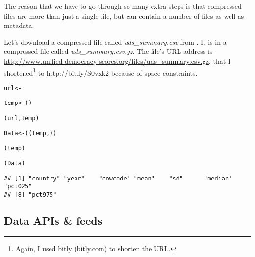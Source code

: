 \noindent The reason that we have to go through so many extra steps is that compressed files are more than just a single file, but can contain a number of files as well as metadata.

Let's download a compressed file called {\emph{uds\_summary.csv}} from \cite{Pemstein2010}. It is in a compressed file called {\emph{uds\_summary.csv.gz}}. The file's URL address is {\url{http://www.unified-democracy-scores.org/files/uds_summary.csv.gz}}, that I shortened\footnote{Again, I used bitly (\url{bitly.com}) to shorten the URL.} to \url{http://bit.ly/S0vxk2} because of space constraints.

{\scriptsize
\begin{knitrout}
\color{fgcolor}\begin{kframe}
\begin{alltt}
url <- 

temp <- ()

(url, temp)

Data <- ((temp, ))

(temp)

(Data)
\end{alltt}
\begin{verbatim}
## [1] "country" "year"    "cowcode" "mean"    "sd"      "median"  "pct025" 
## [8] "pct975"
\end{verbatim}
\end{kframe}
\end{knitrout}

}

\subsection{Data APIs \& feeds}



